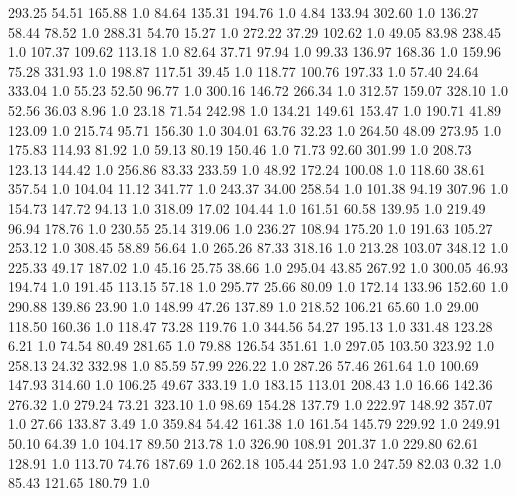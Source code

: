   293.25    54.51   165.88  1.0
   84.64   135.31   194.76  1.0
    4.84   133.94   302.60  1.0
  136.27    58.44    78.52  1.0
  288.31    54.70    15.27  1.0
  272.22    37.29   102.62  1.0
   49.05    83.98   238.45  1.0
  107.37   109.62   113.18  1.0
   82.64    37.71    97.94  1.0
   99.33   136.97   168.36  1.0
  159.96    75.28   331.93  1.0
  198.87   117.51    39.45  1.0
  118.77   100.76   197.33  1.0
   57.40    24.64   333.04  1.0
   55.23    52.50    96.77  1.0
  300.16   146.72   266.34  1.0
  312.57   159.07   328.10  1.0
   52.56    36.03     8.96  1.0
   23.18    71.54   242.98  1.0
  134.21   149.61   153.47  1.0
  190.71    41.89   123.09  1.0
  215.74    95.71   156.30  1.0
  304.01    63.76    32.23  1.0
  264.50    48.09   273.95  1.0
  175.83   114.93    81.92  1.0
   59.13    80.19   150.46  1.0
   71.73    92.60   301.99  1.0
  208.73   123.13   144.42  1.0
  256.86    83.33   233.59  1.0
   48.92   172.24   100.08  1.0
  118.60    38.61   357.54  1.0
  104.04    11.12   341.77  1.0
  243.37    34.00   258.54  1.0
  101.38    94.19   307.96  1.0
  154.73   147.72    94.13  1.0
  318.09    17.02   104.44  1.0
  161.51    60.58   139.95  1.0
  219.49    96.94   178.76  1.0
  230.55    25.14   319.06  1.0
  236.27   108.94   175.20  1.0
  191.63   105.27   253.12  1.0
  308.45    58.89    56.64  1.0
  265.26    87.33   318.16  1.0
  213.28   103.07   348.12  1.0
  225.33    49.17   187.02  1.0
   45.16    25.75    38.66  1.0
  295.04    43.85   267.92  1.0
  300.05    46.93   194.74  1.0
  191.45   113.15    57.18  1.0
  295.77    25.66    80.09  1.0
  172.14   133.96   152.60  1.0
  290.88   139.86    23.90  1.0
  148.99    47.26   137.89  1.0
  218.52   106.21    65.60  1.0
   29.00   118.50   160.36  1.0
  118.47    73.28   119.76  1.0
  344.56    54.27   195.13  1.0
  331.48   123.28     6.21  1.0
   74.54    80.49   281.65  1.0
   79.88   126.54   351.61  1.0
  297.05   103.50   323.92  1.0
  258.13    24.32   332.98  1.0
   85.59    57.99   226.22  1.0
  287.26    57.46   261.64  1.0
  100.69   147.93   314.60  1.0
  106.25    49.67   333.19  1.0
  183.15   113.01   208.43  1.0
   16.66   142.36   276.32  1.0
  279.24    73.21   323.10  1.0
   98.69   154.28   137.79  1.0
  222.97   148.92   357.07  1.0
   27.66   133.87     3.49  1.0
  359.84    54.42   161.38  1.0
  161.54   145.79   229.92  1.0
  249.91    50.10    64.39  1.0
  104.17    89.50   213.78  1.0
  326.90   108.91   201.37  1.0
  229.80    62.61   128.91  1.0
  113.70    74.76   187.69  1.0
  262.18   105.44   251.93  1.0
  247.59    82.03     0.32  1.0
   85.43   121.65   180.79  1.0
